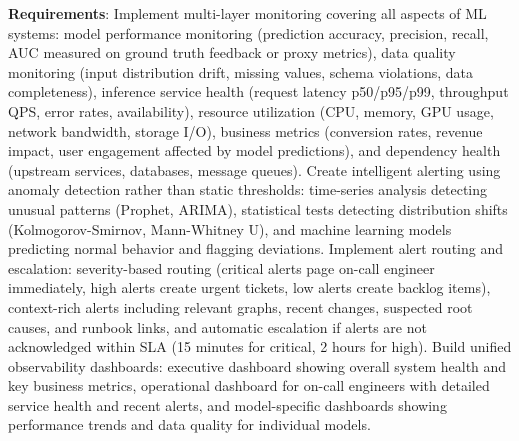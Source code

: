 \textbf{Requirements}: Implement multi-layer monitoring covering all aspects of ML systems: model performance monitoring (prediction accuracy, precision, recall, AUC measured on ground truth feedback or proxy metrics), data quality monitoring (input distribution drift, missing values, schema violations, data completeness), inference service health (request latency p50/p95/p99, throughput QPS, error rates, availability), resource utilization (CPU, memory, GPU usage, network bandwidth, storage I/O), business metrics (conversion rates, revenue impact, user engagement affected by model predictions), and dependency health (upstream services, databases, message queues). Create intelligent alerting using anomaly detection rather than static thresholds: time-series analysis detecting unusual patterns (Prophet, ARIMA), statistical tests detecting distribution shifts (Kolmogorov-Smirnov, Mann-Whitney U), and machine learning models predicting normal behavior and flagging deviations. Implement alert routing and escalation: severity-based routing (critical alerts page on-call engineer immediately, high alerts create urgent tickets, low alerts create backlog items), context-rich alerts including relevant graphs, recent changes, suspected root causes, and runbook links, and automatic escalation if alerts are not acknowledged within SLA (15 minutes for critical, 2 hours for high). Build unified observability dashboards: executive dashboard showing overall system health and key business metrics, operational dashboard for on-call engineers with detailed service health and recent alerts, and model-specific dashboards showing performance trends and data quality for individual models.

